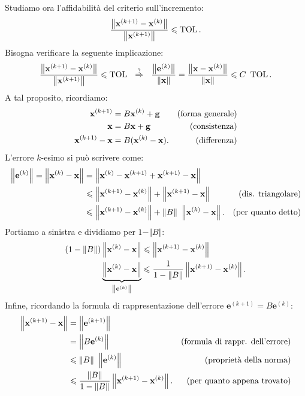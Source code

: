 Studiamo ora l'affidabilità del criterio sull'incremento:
\begin{equation}
\frac{\left\Vert \mathbf{x}^{( k+1)} -\mathbf{x}^{(k)}\right\Vert }{\left\Vert \mathbf{x}^{( k+1)}\right\Vert } \leqslant \operatorname{TOL}.
\label{eq:criterio-incremento}
\end{equation}
Bisogna verificare la seguente implicazione:
\begin{equation*}
\frac{\left\Vert \x^{( k+1)} -\x^{(k)}\right\Vert }{\left\Vert \x^{( k+1)}\right\Vert } \leqslant \operatorname{TOL} \ \ \overset{?}{\Rightarrow } \ \ \frac{\left\Vert \mathbf{e}^{(k)}\right\Vert }{\Vert \x\Vert } =\frac{\left\Vert \x -\x^{(k)}\right\Vert }{\Vert \x\Vert } \leqslant C\ \operatorname{TOL}.
\end{equation*}
A tal proposito, ricordiamo:
\begin{align*}
\mathbf{x}^{( k+1)} & =B\mathbf{x}^{(k)} +\mathbf{g} & \text{(forma generale)}\\
\mathbf{x} & =B\mathbf{x} +\mathbf{g} & \text{(consistenza)}\\
\mathbf{x}^{( k+1)} -\mathbf{x} & =B(\mathbf{x}^{(k)} -\mathbf{x}). & \text{(differenza)}
\end{align*}
L'errore $k$-esimo si può scrivere come:
\begin{align*}
  \left\Vert \mathbf{e}^{(k)}\right\Vert =\left\Vert \mathbf{x}^{(k)} -\mathbf{x}\right\Vert & =\left\Vert \mathbf{x}^{(k)} -\mathbf{x}^{( k+1)} +\mathbf{x}^{( k+1)} -\mathbf{x}\right\Vert                                             &                           \\
  & \leqslant \left\Vert \mathbf{x}^{( k+1)} -\mathbf{x}^{(k)}\right\Vert +\left\Vert \mathbf{x}^{( k+1)} -\mathbf{x}\right\Vert              & \text{(dis. triangolare)} \\
  & \leqslant \left\Vert \mathbf{x}^{( k+1)} -\mathbf{x}^{(k)}\right\Vert +\Vert B\Vert \ \left\Vert \mathbf{x}^{(k)} -\mathbf{x}\right\Vert. & \text{(per quanto detto)}
\end{align*}
Portiamo a sinistra e dividiamo per $1-\Vert B\Vert $:
\begin{align*}
( 1-\Vert B\Vert )\left\Vert \mathbf{x}^{(k)} -\mathbf{x}\right\Vert  & \leqslant \left\Vert \mathbf{x}^{( k+1)} -\mathbf{x}^{(k)}\right\Vert \\
\underbrace{\left\Vert \mathbf{x}^{(k)} -\mathbf{x}\right\Vert }_{\left\Vert \mathbf{e}^{(k)}\right\Vert } & \leqslant \frac{1}{1-\Vert B\Vert }\left\Vert \mathbf{x}^{( k+1)} -\mathbf{x}^{(k)}\right\Vert.
\end{align*}
Infine, ricordando la formula di rappresentazione dell'errore $\mathbf{e}^{( k+1)} =B\mathbf{e}^{(k)}$:
\begin{align*}
\left\Vert \mathbf{x}^{( k+1)} -\mathbf{x}\right\Vert  & =\left\Vert \mathbf{e}^{( k+1)}\right\Vert  & \\
 & =\left\Vert B\mathbf{e}^{(k)}\right\Vert  & \text{(formula di rappr. dell'errore)}\\
 & \leqslant \Vert B\Vert \ \left\Vert \mathbf{e}^{(k)}\right\Vert  & \text{(proprietà della norma)}\\
 & \leqslant \frac{\Vert B\Vert }{1-\Vert B\Vert }\left\Vert \mathbf{x}^{( k+1)} -\mathbf{x}^{(k)}\right\Vert.  & \text{(per quanto appena trovato)}
\end{align*}
